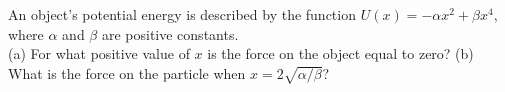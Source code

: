 An object's potential energy is described by the function $U(x) =
-\alpha x^2 + \beta x^4$, where $\alpha$ and $\beta$ are positive
constants.\\
%
(a) For what positive value of $x$ is the force on the object equal to
zero?\answercheck\hwendpart
%
(b) What is the force on the particle when $x = 2\sqrt{\alpha/\beta}$?\answercheck
